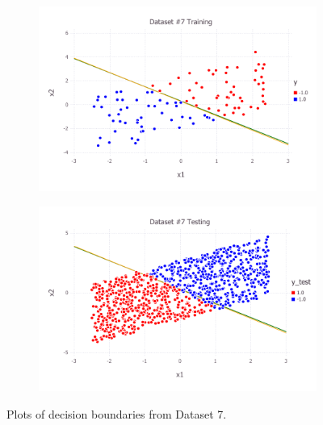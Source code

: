 \begin{figure}[h!]
\centering
    \begin{subfigure}[b]{0.45\textwidth}
	\includegraphics[scale=0.6]{figures/train_final_7.pdf}
    \end{subfigure}
    \quad
    \begin{subfigure}[b]{0.45\textwidth}
	\includegraphics[scale=0.6]{figures/test_final_7.pdf}
	\end{subfigure}
    \caption{Plots of decision boundaries from Dataset 7.}  \label{fig:dataset_7}  
\end{figure}
